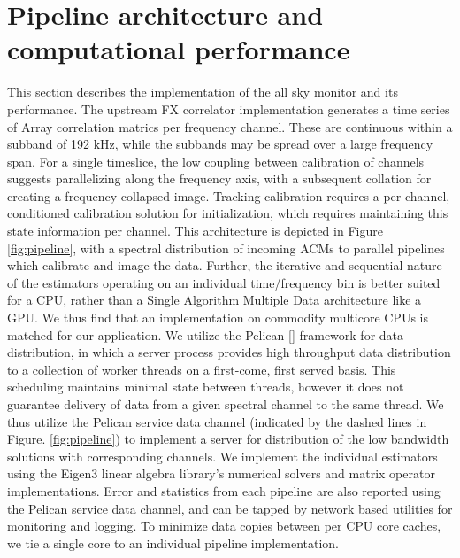 \documentclass{aa}
\begin{document}
\section{\label{sec:Computational-performance}Pipeline architecture and computational performance}
This  section  describes the  implementation  of the  all  sky  monitor and  its
performance. The  upstream FX correlator implementation generates  a time series
of Array correlation matrics per  frequency channel. These are continuous within
a subband of  192 kHz, while the  subbands may be spread over  a large frequency
span. For a  single timeslice, the low coupling  between calibration of channels
suggests parallelizing along the frequency axis, with a subsequent collation for
creating  a   frequency  collapsed  image.   Tracking   calibration  requires  a
per-channel, conditioned calibration solution for initialization, which requires
maintaining this state information per channel. This architecture is depicted in
Figure  \ref{fig:pipeline}, with  a spectral  distribution of  incoming  ACMs to
parallel pipelines which  calibrate and image the data.   Further, the iterative
and   sequential  nature   of  the   estimators  operating   on   an  individual
time/frequency bin  is better suited for  a CPU, rather than  a Single Algorithm
Multiple Data architecture  like a GPU.  We thus find  that an implementation on
commodity multicore CPUs is matched for our application.  We utilize the Pelican
[]  framework for data  distribution, in  which a  server process  provides high
throughput data distribution to a  collection of worker threads on a first-come,
first  served basis. This  scheduling maintains  minimal state  between threads,
however it does not guarantee delivery  of data from a given spectral channel to
the same thread. We thus utilize  the Pelican service data channel (indicated by
the  dashed lines  in Figure.   \ref{fig:pipeline})  to implement  a server  for
distribution  of the  low bandwidth  solutions with  corresponding  channels. We
implement  the individual  estimators using  the Eigen3  \citep{eigenweb} linear
algebra library's  numerical solvers and matrix  operator implementations. Error
and statistics  from each pipeline are  also reported using  the Pelican service
data channel,  and can be tapped  by network based utilities  for monitoring and
logging. To  minimize data copies between per  CPU core caches, we  tie a single
core to an individual pipeline implementation.

\end{document}
